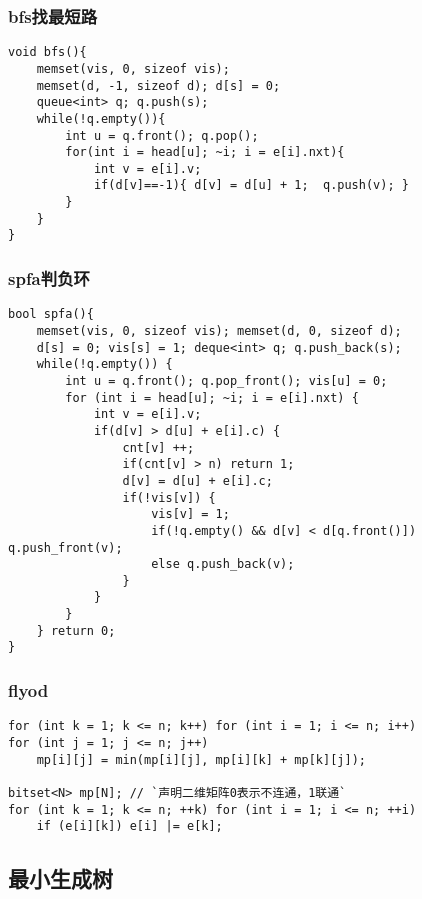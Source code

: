 \subsubsection{bfs找最短路}

\begin{lstlisting}
void bfs(){
    memset(vis, 0, sizeof vis);
    memset(d, -1, sizeof d); d[s] = 0;
    queue<int> q; q.push(s);
    while(!q.empty()){
        int u = q.front(); q.pop();
        for(int i = head[u]; ~i; i = e[i].nxt){
            int v = e[i].v;
            if(d[v]==-1){ d[v] = d[u] + 1;  q.push(v); }
        }
    }
}
\end{lstlisting}

\subsubsection{spfa判负环}

\begin{lstlisting}
bool spfa(){
    memset(vis, 0, sizeof vis); memset(d, 0, sizeof d);
    d[s] = 0; vis[s] = 1; deque<int> q; q.push_back(s);
    while(!q.empty()) {
        int u = q.front(); q.pop_front(); vis[u] = 0;
        for (int i = head[u]; ~i; i = e[i].nxt) {
            int v = e[i].v;
            if(d[v] > d[u] + e[i].c) {
                cnt[v] ++;
                if(cnt[v] > n) return 1;
                d[v] = d[u] + e[i].c;
                if(!vis[v]) {
                    vis[v] = 1;
                    if(!q.empty() && d[v] < d[q.front()]) q.push_front(v);
                    else q.push_back(v);
                }
            }
        }
    } return 0;
}
\end{lstlisting}

\subsubsection{flyod}

\begin{lstlisting}
for (int k = 1; k <= n; k++) for (int i = 1; i <= n; i++)
for (int j = 1; j <= n; j++)
	mp[i][j] = min(mp[i][j], mp[i][k] + mp[k][j]);

bitset<N> mp[N]; // `声明二维矩阵0表示不连通，1联通`
for (int k = 1; k <= n; ++k) for (int i = 1; i <= n; ++i) 
	if (e[i][k]) e[i] |= e[k];
\end{lstlisting}


\subsection{最小生成树}

